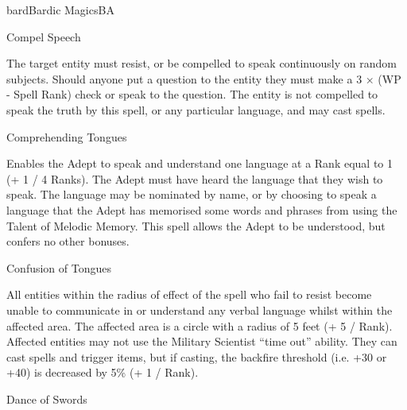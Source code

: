 \begin{College}[2.1]{bard}{Bardic Magics}{BA}
\begin{spell}[S-2]{Compel Speech}

\begin{effects}
The target entity must resist, or be compelled to speak continuously
on random subjects.  Should anyone put a question to the entity they
must make a 3 × (WP - Spell Rank) check or speak to the question.  The
entity is not compelled to speak the truth by this spell, or any
particular language, and may cast spells.
\end{effects}
\end{spell}

\begin{spell}[S-3]{Comprehending Tongues}

\begin{effects}
Enables the Adept to speak and understand one language at a Rank equal
to 1 (+ 1 / 4 Ranks).  The Adept must have heard the language that
they wish to speak. The language may be nominated by name, or by
choosing to speak a language that the Adept has memorised some words
and phrases from using the Talent of Melodic Memory.  This spell
allows the Adept to be understood, but confers no other bonuses.
\end{effects}
\end{spell}

\begin{spell}[S-4]{Confusion of Tongues}

\begin{effects}
All entities within the radius of effect of the spell who fail to
resist become unable to communicate in or understand any verbal
language whilst within the affected area. The affected area is a
circle with a radius of 5 feet (+ 5 / Rank).  Affected entities may
not use the Military Scientist “time out” ability. They can cast
spells and trigger items, but if casting, the backfire threshold (i.e.
+30 or +40) is decreased by 5\% (+ 1 / Rank).
\end{effects}
\end{spell}

\begin{spell}[S-5]{Dance of Swords}


\end{spell}
\end{College}
